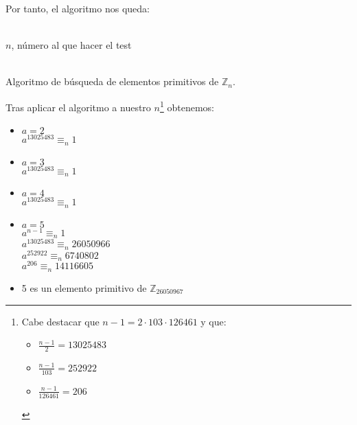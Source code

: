 \begin{enumerate}
		Por tanto, el algoritmo nos queda:
		\begin{algorithm}[H]
		\begin{algorithmic}[1]
			\REQUIRE \ \\
				\texttt{$n$}, número al que hacer el test \\ \
				\ELSE
						\ENDIF
					\ENDFOR
				\ENDIF
					\ENDFOR
				\ELSE
				\ENDIF
			\ENDWHILE
			\ENDIF
		\end{algorithmic}
		\caption{Algoritmo de búsqueda de elementos primitivos de $\mathbb{Z}_n$.}
		\label{Primitive}
		\end{algorithm}
		
		Tras aplicar el algoritmo a nuestro $n$\footnote{Cabe destacar que $n-1 = 2 \cdot 103 \cdot 126461$ y que:
		\begin{itemize}
			\item $\displaystyle \frac{n-1}{2} = 13025483$
			\item $\displaystyle \frac{n-1}{103} = 252922$
			\item $\displaystyle \frac{n-1}{126461} = 206$
		\end{itemize}} obtenemos:
		\begin{itemize}
			\item $a = 2$ \\
			$a^{13025483} \equiv_n  1$ \\
			
			\item $a = 3$ \\
			$a^{13025483} \equiv_n  1$ \\
			
			\item $a = 4$ \\
			$a^{13025483} \equiv_n  1$
			
			\item $a = 5$ \\
			$a^{n-1} \equiv_n 1$ \\
			$a^{13025483} \equiv_n 26050966$ \\
			$a^{252922} \equiv_n 6740802$ \\
			$a^{206} \equiv_n 14116605$ \\
			
			\item 5 es un elemento primitivo de $\mathbb{Z}_{26050967}$
		\end{itemize}
	\end{enumerate}
